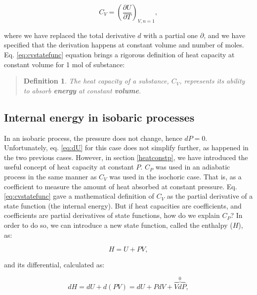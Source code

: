 \documentclass[
  9pt,
]{extbook}
\theoremstyle{definition}
\newtheorem{definition}{Definition}[chapter]
\theoremstyle{definition}
\theoremstyle{definition}
\theoremstyle{remark}
\begin{document}
\begin{equation}
  C_V = \left( \frac{\partial U} {\partial T} \right)_{V,n=1},
  \label{eq:cvstatefunc}
\end{equation}

where we have replaced the total derivative \(d\) with a partial one \(\partial\), and we have specified that the derivation happens at constant volume and number of moles. Eq. \eqref{eq:cvstatefunc} equation brings a rigorous definition of heat capacity at constant volume for 1 mol of substance:

\begin{quote}
\begin{definition}
\protect\hypertarget{def:newdefcv}{}{\label{def:newdefcv} }\emph{The heat capacity of a substance, \(C_V\), represents its ability to absorb \textbf{energy} at constant \textbf{volume}.}
\end{definition}
\end{quote}

\hypertarget{enthalpy}{%
\subsection{Internal energy in isobaric processes}\label{enthalpy}}

In an isobaric process, the pressure does not change, hence \(dP=0\). Unfortunately, eq. \eqref{eq:dU} for this case does not simplify further, as happened in the two previous cases. However, in section \ref{heatconstp}, we have introduced the useful concept of heat capacity at constant \(P\). \(C_P\) was used in an adiabatic process in the same manner as \(C_V\) was used in the isochoric case. That is, as a coefficient to measure the amount of heat absorbed at constant pressure. Eq. \eqref{eq:cvstatefunc} gave a mathematical definition of \(C_V\) as the partial derivative of a state function (the internal energy). But if heat capacities are coefficients, and coefficients are partial derivatives of state functions, how do we explain \(C_P\)? In order to do so, we can introduce a new state function, called the enthalpy (\(H\)), as:

\begin{equation}
  H = U + PV,
  \label{eq:enthalpydef}
\end{equation}

and its differential, calculated as:

\begin{equation}
  dH = dU + d(PV) = dU + PdV + \overbrace{VdP}^{0},
  \label{eq:enthalpydefdiff}
\end{equation}
\end{document}
